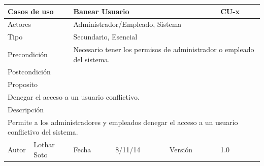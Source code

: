 \documentclass{article}
\begin{document}
\begin{table}[h]
\begin{tabular}{|l|l|l|l|l|l|}
\hline
\multicolumn{2}{|p{2cm}|}{Casos de uso}  & \multicolumn{3}{p{7cm}|}{Banear Usuario} & CU-x \\
\hline
\multicolumn{2}{|p{2cm}|}{Actores}       & \multicolumn{4}{p{8cm}|}{Administrador/Empleado, Sistema}        \\
\hline
\multicolumn{2}{|p{2cm}|}{Tipo}          & \multicolumn{4}{p{8cm}|}{Secundario, Esencial}        \\
\hline
\multicolumn{2}{|p{2cm}|}{Precondición}  & \multicolumn{4}{p{8cm}|}{Necesario tener los permisos de administrador o empleado del sistema.}        \\
\hline
\multicolumn{2}{|p{2cm}|}{Postcondición} & \multicolumn{4}{p{8cm}|}{}        \\
\hline
\multicolumn{6}{|p{10cm}|}{Proposito}                                   \\
\hline
\multicolumn{6}{|p{10cm}|}{Denegar el acceso a un usuario conflictivo.}                                            \\
\hline
\multicolumn{6}{|p{10cm}|}{Descripción}                                 \\
\hline
\multicolumn{6}{|p{10cm}|}{Permite a los administradores y empleados denegar el acceso a un usuario conflictivo del sistema.}                                            \\
\hline
Autor          &       Lothar Soto        & Fecha    &  8/11/14   &   Versión  & 1.0\\    
\hline
\end{tabular}
\end{table}
\end{document}
